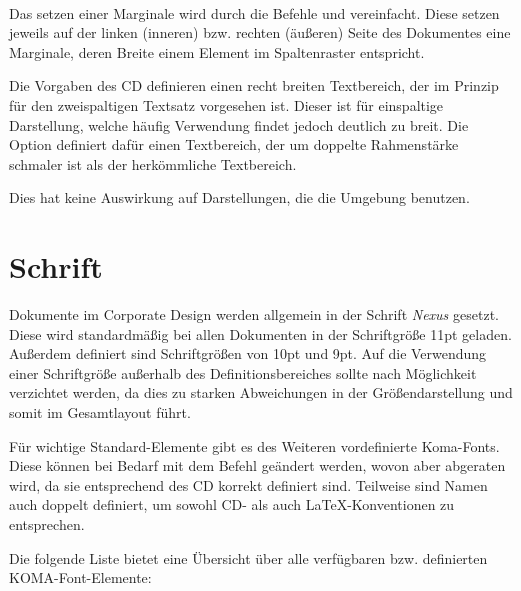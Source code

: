 \begin{Declaration}
  \\
\end{Declaration}

Das setzen einer Marginale wird durch die Befehle  und
 vereinfacht. Diese setzen jeweils auf der linken (inneren)
bzw. rechten (äußeren) Seite des Dokumentes eine Marginale, deren Breite
einem Element im Spaltenraster entspricht.

\begin{Declaration}
\end{Declaration}

Die Vorgaben des CD definieren einen recht breiten Textbereich, der im Prinzip
für den zweispaltigen Textsatz vorgesehen ist. Dieser ist für einspaltige
Darstellung, welche häufig Verwendung findet jedoch deutlich zu breit.
Die Option  definiert dafür einen Textbereich, der um
doppelte Rahmenstärke schmaler ist als der herkömmliche Textbereich.
\begin{important}
Dies hat keine Auswirkung auf Darstellungen, die die Umgebung
 benutzen.
\end{important}


\section{Schrift}

Dokumente im Corporate Design werden allgemein in der Schrift \emph{Nexus}
gesetzt. Diese wird standardmäßig bei allen Dokumenten in der Schriftgröße
11pt geladen. Außerdem definiert sind Schriftgrößen von 10pt und 9pt.
Auf die Verwendung einer Schriftgröße außerhalb des Definitionsbereiches sollte
nach Möglichkeit verzichtet werden, da dies zu starken Abweichungen in der
Größendarstellung und somit im Gesamtlayout führt.


Für wichtige Standard-Elemente gibt es des Weiteren vordefinierte Koma-Fonts.
Diese können bei Bedarf mit dem Befehl  
geändert werden, wovon aber abgeraten wird, da sie entsprechend des CD korrekt
definiert sind. Teilweise sind Namen auch doppelt definiert, um sowohl
CD- als auch \LaTeX-Konventionen zu entsprechen.

Die folgende Liste bietet eine Übersicht über alle verfügbaren bzw.
definierten KOMA-Font-Elemente:

